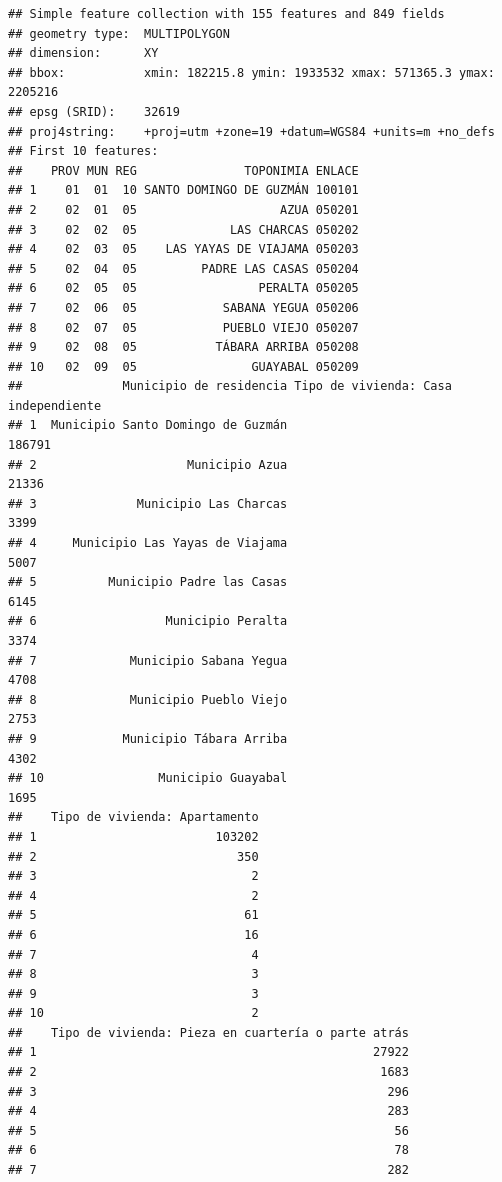\documentclass[11pt,]{article}
\begin{document}
\begin{verbatim}
## Simple feature collection with 155 features and 849 fields
## geometry type:  MULTIPOLYGON
## dimension:      XY
## bbox:           xmin: 182215.8 ymin: 1933532 xmax: 571365.3 ymax: 2205216
## epsg (SRID):    32619
## proj4string:    +proj=utm +zone=19 +datum=WGS84 +units=m +no_defs
## First 10 features:
##    PROV MUN REG               TOPONIMIA ENLACE
## 1    01  01  10 SANTO DOMINGO DE GUZMÁN 100101
## 2    02  01  05                    AZUA 050201
## 3    02  02  05             LAS CHARCAS 050202
## 4    02  03  05    LAS YAYAS DE VIAJAMA 050203
## 5    02  04  05         PADRE LAS CASAS 050204
## 6    02  05  05                 PERALTA 050205
## 7    02  06  05            SABANA YEGUA 050206
## 8    02  07  05            PUEBLO VIEJO 050207
## 9    02  08  05           TÁBARA ARRIBA 050208
## 10   02  09  05                GUAYABAL 050209
##              Municipio de residencia Tipo de vivienda: Casa independiente
## 1  Municipio Santo Domingo de Guzmán                               186791
## 2                     Municipio Azua                                21336
## 3              Municipio Las Charcas                                 3399
## 4     Municipio Las Yayas de Viajama                                 5007
## 5          Municipio Padre las Casas                                 6145
## 6                  Municipio Peralta                                 3374
## 7             Municipio Sabana Yegua                                 4708
## 8             Municipio Pueblo Viejo                                 2753
## 9            Municipio Tábara Arriba                                 4302
## 10                Municipio Guayabal                                 1695
##    Tipo de vivienda: Apartamento
## 1                         103202
## 2                            350
## 3                              2
## 4                              2
## 5                             61
## 6                             16
## 7                              4
## 8                              3
## 9                              3
## 10                             2
##    Tipo de vivienda: Pieza en cuartería o parte atrás
## 1                                               27922
## 2                                                1683
## 3                                                 296
## 4                                                 283
## 5                                                  56
## 6                                                  78
## 7                                                 282

\end{verbatim}
\end{document}
